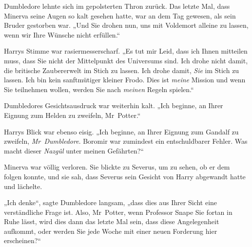 Dumbledore lehnte sich im gepolsterten Thron zurück. Das letzte Mal, dass Minerva seine Augen so kalt gesehen hatte, war an dem Tag gewesen, als sein Bruder gestorben war. „Und Sie drohen nun, uns mit Voldemort alleine zu lassen, wenn wir Ihre Wünsche nicht erfüllen.“

Harrys Stimme war rasiermesserscharf. „Es tut mir Leid, dass ich Ihnen mitteilen muss, dass Sie nicht der Mittelpunkt des Universums sind. Ich drohe nicht damit, die britische Zaubererwelt im Stich zu lassen. Ich drohe damit, \emph{Sie} im Stich zu lassen. Ich bin kein sanftmütiger kleiner Frodo. Dies ist \emph{meine} Mission und wenn Sie teilnehmen wollen, werden Sie nach \emph{meinen} Regeln spielen.“

Dumbledores Gesichtsausdruck war weiterhin kalt. „Ich beginne, an Ihrer Eignung zum Helden zu zweifeln, Mr~Potter.“

Harrys Blick war ebenso eisig. „Ich beginne, an Ihrer Eignung zum Gandalf zu zweifeln, \emph{Mr~Dumbledore}. Boromir war zumindest ein entschuldbarer Fehler. Was macht dieser \emph{Nazgûl} unter meinen Gefährten?“

Minerva war völlig verloren. Sie blickte zu Severus, um zu sehen, ob er dem folgen konnte, und sie sah, dass Severus sein Gesicht von Harry abgewandt hatte und lächelte.

„Ich denke“, sagte Dumbledore langsam, „dass dies aus Ihrer Sicht eine verständliche Frage ist. Also, Mr~Potter, wenn Professor Snape Sie fortan in Ruhe lässt, wird dies dann das letzte Mal sein, dass diese Angelegenheit aufkommt, oder werden Sie jede Woche mit einer neuen Forderung hier erscheinen?“

